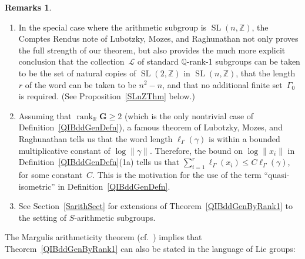 \documentclass[pdftex]{sigma}
\newcommand{\QQ}{\mathbb{Q}}
\newcommand{\RR}{\mathbb{R}}
\newcommand{\ZZ}{\mathbb{Z}}
\newcommand{\Ga}{\mathbf{G}}
\DeclareMathOperator{\rank}{rank}
\DeclareMathOperator{\SL}{SL}
\newcommand{\subgroups}{\mathcal{L}}
\numberwithin{equation}{section}
\theoremstyle{definition}
\newtheorem{rems}[thm]{Remarks}
\begin{document}
\begin{rems} \label{MainRems}
\leavevmode
\begin{enumerate}\itemsep=0pt
\item In the special case where the arithmetic subgroup is $\SL(n,\ZZ)$, the Comptes Rendus note of Lubotzky, Mozes, and Raghunathan \cite[Corollary~3]{MR1244421} not only proves the full strength of our theorem, but also provides the much more explicit conclusion that the collection~$\subgroups$ of standard $\QQ$-rank-1 subgroups can be taken to be the set of natural copies of $\SL(2,\ZZ)$ in $\SL(n,\ZZ)$, that the length~$r$ of the word can be taken to be $n^2 - n$, and that no additional finite set~$\Gamma_0$ is required. (See Proposition~\ref{SLnZThm} below.)
	
\item \label{MainRems-wordlength}Assuming that $\rank_\RR \Ga \ge 2$ (which is the only nontrivial case of Definition~\ref{QIBddGenDefn}), a famous theorem of Lubotzky, Mozes, and Raghunathan \cite[Theorem~A]{MR1828742} tells us that the word length $\ell_\Gamma(\gamma)$ is within a bounded multiplicative constant of $\log \| \gamma \|$. Therefore, the bound on $\log \|x_i\|$ in Definition~\ref{QIBddGenDefn}(1a) tells us that $\sum\limits_{i=1}^r \ell_\Gamma(x_i) \le C \ell_\Gamma(\gamma)$, for some constant~$C$. This is the motivation for the use of the term ``quasi-isometric'' in Definition~\ref{QIBddGenDefn}.
\item See Section~\ref{SarithSect} for extensions of Theorem~\ref{QIBddGenByRank1} to the setting of $S$-arithmetic subgroups.
\end{enumerate}
\end{rems}

The Margulis arithmeticity theorem (cf.\ \cite[Theorem~5.2.1, p.~90]{Morris-IntroArithGrps}) implies that Theorem~\ref{QIBddGenByRank1} can also be stated in the language of Lie groups:
\end{document}
